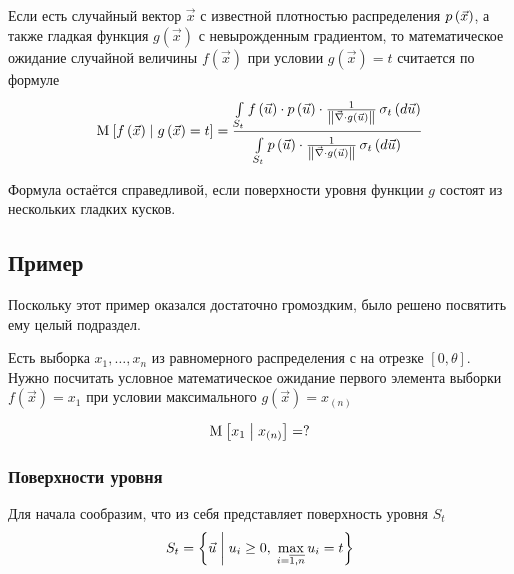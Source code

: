 \begin{theorem}
    \label{conditionalExpectationDefinition}
    Если есть случайный вектор $\vec{x}$ с известной плотностью распределения
    $\pdf{\vec{x}}$, а также гладкая функция $g\left( \vec{x} \right)$
    с невырожденным градиентом, то математическое ожидание случайной величины
    $f\left( \vec{x} \right)$ при условии $g\left( \vec{x} \right) = t$
    считается по формуле
    $$\Mean{f\left( \vec{x} \right) \mcond g\left( \vec{x} \right) = t}
        = \frac{\integrall{S_t}{\sigma_{t}\left(d\vec{u} \right)}{
            f\left( \vec{u} \right) \cdot \pdf{\vec{u}} \cdot \frac{1}{
                \left\| \vec{\nabla} \cdot g\left( \vec{u} \right) \right\|}}}
            {\integrall{S_t}{\sigma_{t}\left(d\vec{u} \right)}{
                \pdf{\vec{u}} \cdot \frac{1}{
                    \left\| \vec{\nabla}
                        \cdot g\left( \vec{u} \right) \right\|}}}$$
\end{theorem}

\begin{remark}
    Формула остаётся справедливой,
    если поверхности уровня функции $g$ состоят из нескольких гладких кусков.
\end{remark}

\subsection{Пример}
Поскольку этот пример оказался достаточно громоздким,
было решено посвятить ему целый подраздел.

Есть выборка $x_1, \dots, x_n$ из равномерного распределения
с на отрезке $\left[ 0, \theta \right]$.
Нужно посчитать условное математическое ожидание
первого элемента выборки $f\left( \vec{x} \right) = x_1$
при условии максимального $g\left( \vec{x} \right) = x_{\left( n \right)}$

$$\Mean{x_1 \mcond x_{\left( n \right)}} = ?$$

\subsubsection{Поверхности уровня}
Для начала сообразим, что из себя представляет поверхность уровня
$S_t$
$$S_t = \left\{ \vec{u} \mcond
    u_i \ge 0,\; \max_{i=\overline{1,n}} u_i = t \right\}$$

